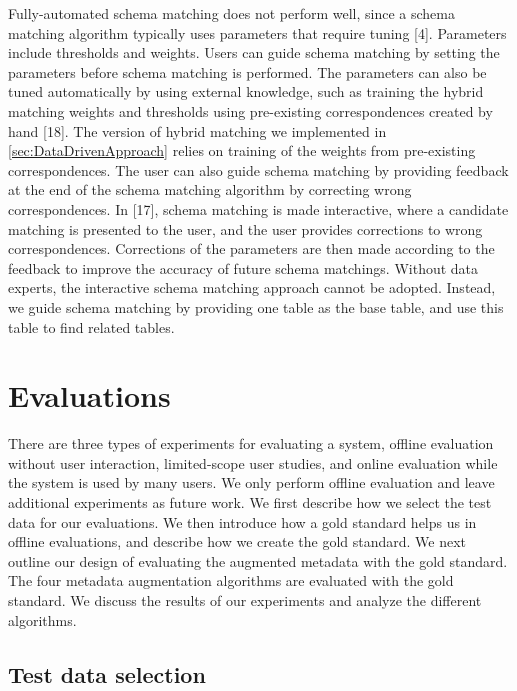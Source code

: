 Fully-automated schema matching does not perform well, since a schema matching algorithm typically uses parameters that require tuning [4]. Parameters include thresholds and weights. Users can guide schema matching by setting the parameters before schema matching is performed. The parameters can also be tuned automatically by using external knowledge, such as training the hybrid matching weights and thresholds using pre-existing correspondences created by hand [18]. The version of hybrid matching we implemented in \autoref{sec:DataDrivenApproach} relies on training of the weights from pre-existing correspondences. The user can also guide schema matching by providing feedback at the end of the schema matching algorithm by correcting wrong correspondences. In [17], schema matching is made interactive, where a candidate matching is presented to the user, and the user provides corrections to wrong correspondences. Corrections of the parameters are then made according to the feedback to improve the accuracy of future schema matchings.
Without data experts, the interactive schema matching approach cannot be adopted. Instead, we guide schema matching by providing one table as the base table, and use this table to find related tables.

\section{Evaluations}
\label{sec:Evaluations}

There are three types of experiments for evaluating a system, offline evaluation without user interaction, limited-scope user studies, and online evaluation while the system is used by many users. We only perform offline evaluation and leave additional experiments as future work. We first describe how we select the test data for our evaluations. We then introduce how a gold standard helps us in offline evaluations, and describe how we create the gold standard. We next outline our design of evaluating the augmented metadata with the gold standard. The four metadata augmentation algorithms are evaluated with the gold standard. We discuss the results of our experiments and analyze the different algorithms.

\subsection{Test data selection}
\label{ssec:TestDataSelection}


